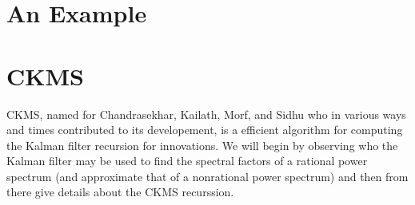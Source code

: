 \documentclass[12pt]{amsart}
\begin{document}
\section{An Example}
\label{sec: Example}

\appendix
\section{CKMS}

CKMS, named for Chandrasekhar, Kailath, Morf, and Sidhu who in various ways and times contributed to its developement, is a efficient algorithm for computing the Kalman filter recursion for innovations. We will begin by observing who the Kalman filter may be used to find the spectral factors of a rational power spectrum (and approximate that of a nonrational power spectrum) and then from there give details about the CKMS recurssion.




\end{document}
